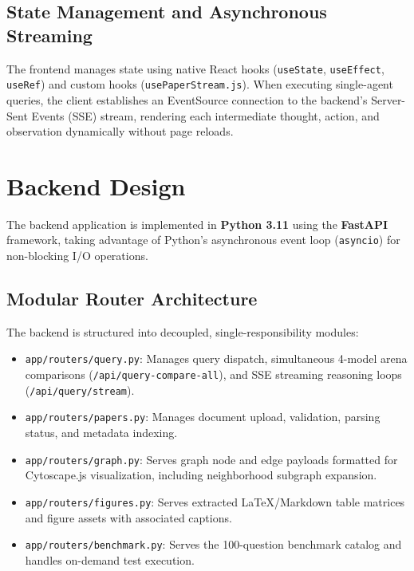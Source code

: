 \subsection{State Management and Asynchronous Streaming}
The frontend manages state using native React hooks (\texttt{useState}, \texttt{useEffect}, \texttt{useRef}) and custom hooks (\texttt{usePaperStream.js}). When executing single-agent queries, the client establishes an EventSource connection to the backend's Server-Sent Events (SSE) stream, rendering each intermediate thought, action, and observation dynamically without page reloads.

\section{Backend Design}
The backend application is implemented in \textbf{Python 3.11} using the \textbf{FastAPI} framework, taking advantage of Python's asynchronous event loop (\texttt{asyncio}) for non-blocking I/O operations.

\subsection{Modular Router Architecture}
The backend is structured into decoupled, single-responsibility modules:
\begin{itemize}
    \item \texttt{app/routers/query.py}: Manages query dispatch, simultaneous 4-model arena comparisons (\texttt{/api/query-compare-all}), and SSE streaming reasoning loops (\texttt{/api/query/stream}).
    \item \texttt{app/routers/papers.py}: Manages document upload, validation, parsing status, and metadata indexing.
    \item \texttt{app/routers/graph.py}: Serves graph node and edge payloads formatted for Cytoscape.js visualization, including neighborhood subgraph expansion.
    \item \texttt{app/routers/figures.py}: Serves extracted LaTeX/Markdown table matrices and figure assets with associated captions.
    \item \texttt{app/routers/benchmark.py}: Serves the 100-question benchmark catalog and handles on-demand test execution.
\end{itemize}

